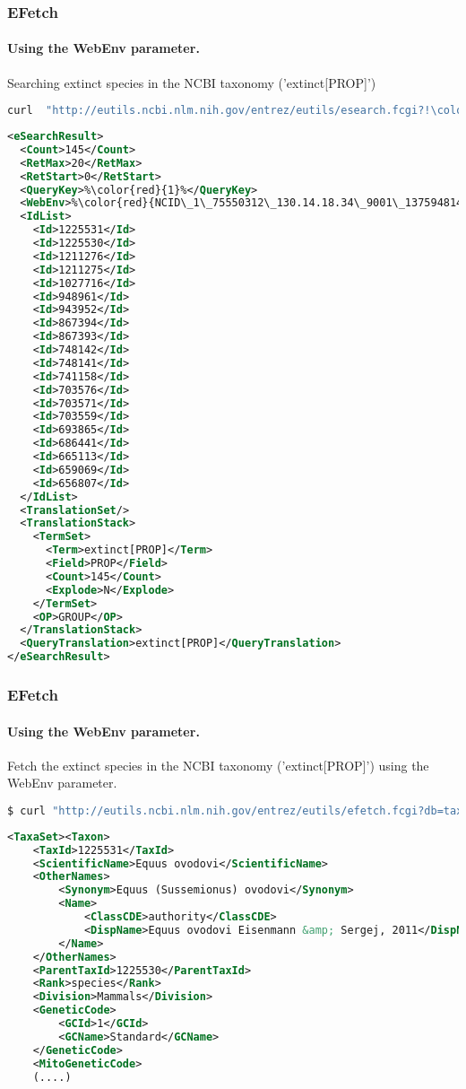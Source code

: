 \documentclass{beamer}
\begin{document}
\begin{frame}[fragile]
\frametitle{EFetch}
\framesubtitle{Using the WebEnv parameter.}
Searching extinct species in the NCBI taxonomy ('extinct[PROP]') 
\begin{lstlisting}[language=bash,basicstyle=\tiny,breaklines=true,escapechar=\!]
curl  "http://eutils.ncbi.nlm.nih.gov/entrez/eutils/esearch.fcgi?!\color{red}{usehistory=y}!&db=taxonomy&term=extinct%5BPROP%5D"
\end{lstlisting}

\begin{lstlisting}[language=xml,basicstyle=\tiny,breaklines=false,escapechar=\%]
<eSearchResult>
  <Count>145</Count>
  <RetMax>20</RetMax>
  <RetStart>0</RetStart>
  <QueryKey>%\color{red}{1}%</QueryKey>
  <WebEnv>%\color{red}{NCID\_1\_75550312\_130.14.18.34\_9001\_1375948145\_325582538}%</WebEnv>
  <IdList>
    <Id>1225531</Id>
    <Id>1225530</Id>
    <Id>1211276</Id>
    <Id>1211275</Id>
    <Id>1027716</Id>
    <Id>948961</Id>
    <Id>943952</Id>
    <Id>867394</Id>
    <Id>867393</Id>
    <Id>748142</Id>
    <Id>748141</Id>
    <Id>741158</Id>
    <Id>703576</Id>
    <Id>703571</Id>
    <Id>703559</Id>
    <Id>693865</Id>
    <Id>686441</Id>
    <Id>665113</Id>
    <Id>659069</Id>
    <Id>656807</Id>
  </IdList>
  <TranslationSet/>
  <TranslationStack>
    <TermSet>
      <Term>extinct[PROP]</Term>
      <Field>PROP</Field>
      <Count>145</Count>
      <Explode>N</Explode>
    </TermSet>
    <OP>GROUP</OP>
  </TranslationStack>
  <QueryTranslation>extinct[PROP]</QueryTranslation>
</eSearchResult>
\end{lstlisting}
\end{frame}

\begin{frame}[fragile]
\frametitle{EFetch}
\framesubtitle{Using the WebEnv parameter.}

Fetch the extinct species in the NCBI taxonomy ('extinct[PROP]') using the WebEnv parameter.

\begin{lstlisting}[language=bash,basicstyle=\tiny,breaklines=true,escapechar=\!]
$ curl "http://eutils.ncbi.nlm.nih.gov/entrez/eutils/efetch.fcgi?db=taxonomy&!\color{red}{query\_key=1\&WebEnv=NCID\_1\_75550312\_130.14.18.34\_9001\_1375948145\_325582538}!&retmode=xml" 
\end{lstlisting}

\begin{lstlisting}[language=xml,basicstyle=\tiny,breaklines=false,escapechar=\%]
<TaxaSet><Taxon>
    <TaxId>1225531</TaxId>
    <ScientificName>Equus ovodovi</ScientificName>
    <OtherNames>
        <Synonym>Equus (Sussemionus) ovodovi</Synonym>
        <Name>
            <ClassCDE>authority</ClassCDE>
            <DispName>Equus ovodovi Eisenmann &amp; Sergej, 2011</DispName>
        </Name>
    </OtherNames>
    <ParentTaxId>1225530</ParentTaxId>
    <Rank>species</Rank>
    <Division>Mammals</Division>
    <GeneticCode>
        <GCId>1</GCId>
        <GCName>Standard</GCName>
    </GeneticCode>
    <MitoGeneticCode>
    (....)
\end{lstlisting}
\end{frame}
\end{document}
